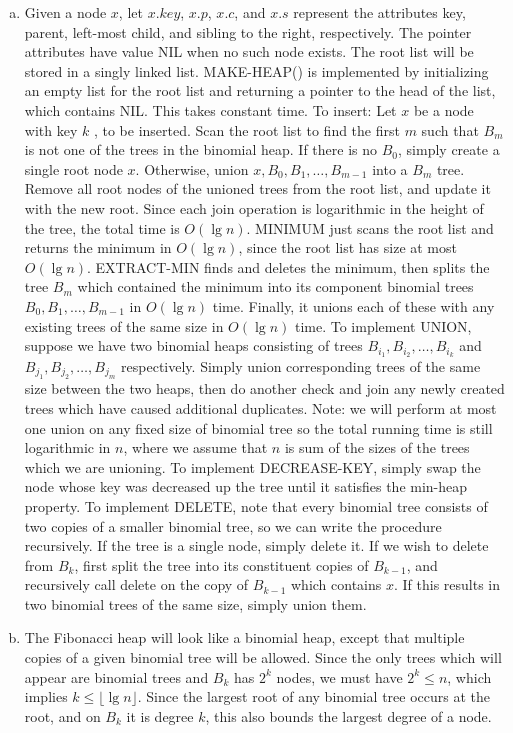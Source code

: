\documentclass{article}
\begin{document}
\begin{enumerate}[a.]
\item Given a node $x$, let $x.key$, $x.p$, $x.c$, and $x.s$ represent the attributes key, parent, left-most child, and sibling to the right, respectively.  The pointer attributes have value NIL when no such node exists.  The root list will be stored in a singly linked list.  MAKE-HEAP() is implemented by initializing an empty list for the root list and returning a pointer to the head of the list, which contains NIL.  This takes constant time.  To insert: Let $x$ be a node with key $k$ , to be inserted.  Scan the root list to find the first $m$ such that $B_m$ is not one of the trees in the binomial heap.  If there is no $B_0$, simply create a single root node $x$.  Otherwise, union $x, B_0, B_1, \ldots, B_{m-1}$ into a $B_m$ tree.  Remove all root nodes of the unioned trees from the root list, and update it with the new root.  Since each join operation is logarithmic in the height of the tree, the total time is $O(\lg n)$. MINIMUM just scans the root list and returns the minimum in $O(\lg n)$, since the root list has size at most $O(\lg n)$. EXTRACT-MIN finds and deletes the minimum, then splits the tree $B_m$ which contained the minimum into its component binomial trees $B_0, B_1, \ldots, B_{m-1}$ in $O(\lg n)$ time. Finally, it unions each of these with any existing trees of the same size in $O(\lg n)$ time.  To implement UNION, suppose we have two binomial heaps consisting of trees $B_{i_1}, B_{i_2}, \ldots, B_{i_k}$ and $B_{j_1}, B_{j_2}, \ldots, B_{j_m}$ respectively.  Simply union corresponding trees of the same size between the two heaps, then do another check and join any newly created trees which have caused additional duplicates.  Note: we will perform at most one union on any fixed size of binomial tree so the total running time is still logarithmic in $n$, where we assume that $n$ is sum of the sizes of the trees which we are unioning.  To implement DECREASE-KEY, simply swap the node whose key was decreased up the tree until it satisfies the min-heap property.  To implement DELETE, note that every binomial tree consists of two copies of a smaller binomial tree, so we can write the procedure recursively.  If the tree is a single node, simply delete it.  If we wish to delete from $B_k$, first split the tree into its constituent copies of $B_{k-1}$, and recursively call delete on the copy of $B_{k-1}$ which contains $x$.  If this results in two binomial trees of the same size, simply union them. \\

\item The Fibonacci heap will look like a binomial heap, except that multiple copies of a given binomial tree will be allowed. Since the only trees which will appear are binomial trees and $B_k$ has $2^k$ nodes, we must have $2^k \leq n$, which implies $k \leq \lfloor \lg n \rfloor$.  Since the largest root of any binomial tree occurs at the root, and on $B_k$ it is degree $k$, this also bounds the largest degree of a node. \\


\end{enumerate}
\end{document}

